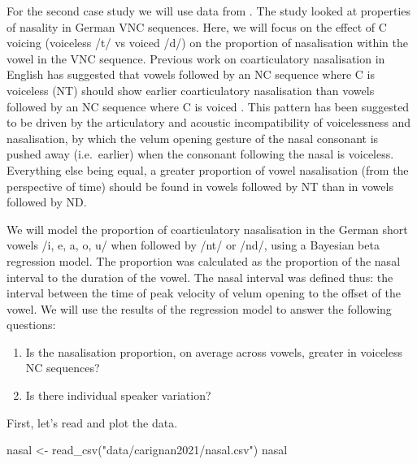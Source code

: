 \documentclass[
  authoryear,
  preprint,
  3p]{elsarticle}
\newenvironment{Shaded}{\begin{snugshade}}{\end{snugshade}}
\newcommand{\FunctionTok}[1]{\textcolor[rgb]{0.28,0.35,0.67}{#1}}
\newcommand{\NormalTok}[1]{\textcolor[rgb]{0.00,0.23,0.31}{#1}}
\newcommand{\OtherTok}[1]{\textcolor[rgb]{0.00,0.23,0.31}{#1}}
\newcommand{\StringTok}[1]{\textcolor[rgb]{0.13,0.47,0.30}{#1}}
\providecommand{\tightlist}{%
  \setlength{\itemsep}{0pt}\setlength{\parskip}{0pt}}\usepackage{longtable,booktabs,array}
\begin{document}
For the second case study we will use data from \citet{carignan2021}.
The study looked at properties of nasality in German VNC sequences.
Here, we will focus on the effect of C voicing (voiceless /t/ vs voiced
/d/) on the proportion of nasalisation within the vowel in the VNC
sequence. Previous work on coarticulatory nasalisation in English has
suggested that vowels followed by an NC sequence where C is voiceless
(NT) should show earlier coarticulatory nasalisation than vowels
followed by an NC sequence where C is voiced \citep[ND, see review
in][]{carignan2021}. This pattern has been suggested to be driven by the
articulatory and acoustic incompatibility of voicelessness and
nasalisation, by which the velum opening gesture of the nasal consonant
is pushed away (i.e.~earlier) when the consonant following the nasal is
voiceless. Everything else being equal, a greater proportion of vowel
nasalisation (from the perspective of time) should be found in vowels
followed by NT than in vowels followed by ND.

We will model the proportion of coarticulatory nasalisation in the
German short vowels /i, e, a, o, u/ when followed by /nt/ or /nd/, using
a Bayesian beta regression model. The proportion was calculated as the
proportion of the nasal interval to the duration of the vowel. The nasal
interval was defined thus: the interval between the time of peak
velocity of velum opening to the offset of the vowel. We will use the
results of the regression model to answer the following questions:

\begin{enumerate}
\def\labelenumi{\arabic{enumi}.}
\tightlist
\item
  Is the nasalisation proportion, on average across vowels, greater in
  voiceless NC sequences?
\item
  Is there individual speaker variation?
\end{enumerate}

First, let's read and plot the data.

\begin{Shaded}
\begin{Highlighting}[]
\NormalTok{nasal }\OtherTok{\textless{}{-}} \FunctionTok{read\_csv}\NormalTok{(}\StringTok{"data/carignan2021/nasal.csv"}\NormalTok{)}
\NormalTok{nasal}
\end{Highlighting}
\end{Shaded}
\end{document}
